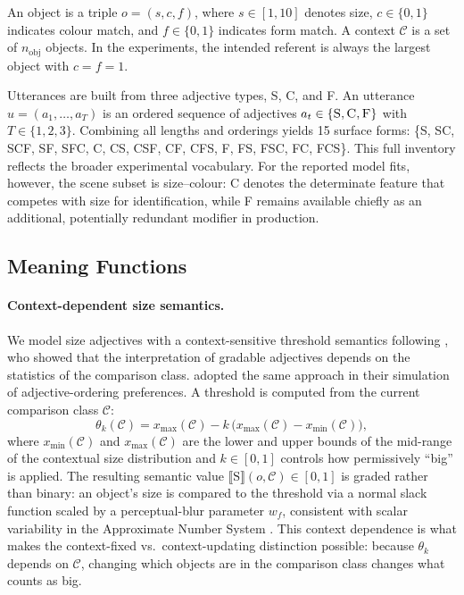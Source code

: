 \documentclass[man,floatsintext]{apa7}
\newcommand{\adj}[1]{\textsc{#1}}
\newcommand{\utter}[1]{\textsf{#1}}
\begin{document}
An object is a triple $o = (s, c, f)$, where $s \in [1,10]$ denotes size, $c \in \{0,1\}$ indicates colour match, and $f \in \{0,1\}$ indicates form match.
A context $\mathcal{C}$ is a set of $n_\text{obj}$ objects.
In the experiments, the intended referent is always the largest object with $c = f = 1$.

Utterances are built from three adjective types, \adj{S}, \adj{C}, and \adj{F}.
An utterance $u = (a_1, \ldots, a_T)$ is an ordered sequence of adjectives $a_t \in \{\adj{S}, \adj{C}, \adj{F}\}$ with $T \in \{1,2,3\}$.
Combining all lengths and orderings yields 15 surface forms:
\{\utter{S}, \utter{SC}, \utter{SCF}, \utter{SF}, \utter{SFC}, \utter{C}, \utter{CS}, \utter{CSF}, \utter{CF}, \utter{CFS}, \utter{F}, \utter{FS}, \utter{FSC}, \utter{FC}, \utter{FCS}\}.
This full inventory reflects the broader experimental vocabulary.
For the reported model fits, however, the scene subset is size--colour: \adj{C} denotes the determinate feature that competes with size for identification, while \adj{F} remains available chiefly as an additional, potentially redundant modifier in production.

\subsection{Meaning Functions}
\label{sec:model:semantics}

\paragraph{Context-dependent size semantics.}
We model size adjectives with a context-sensitive threshold semantics following \citet{schmidt2009how}, who showed that the interpretation of gradable adjectives depends on the statistics of the comparison class.
\citet{franke2019subjectivity} adopted the same approach in their simulation of adjective-ordering preferences.
A threshold is computed from the current comparison class $\mathcal{C}$:
\begin{equation}
  \theta_k(\mathcal{C})
  = x_\text{max}(\mathcal{C})
    - k \,\bigl(x_\text{max}(\mathcal{C}) - x_\text{min}(\mathcal{C})\bigr),
  \label{eq:threshold}
\end{equation}
where $x_\text{min}(\mathcal{C})$ and $x_\text{max}(\mathcal{C})$ are the lower and upper bounds of the mid-range of the contextual size distribution and $k \in [0,1]$ controls how permissively ``big'' is applied.
The resulting semantic value $\llbracket\text{S}\rrbracket(o, \mathcal{C}) \in [0,1]$ is graded rather than binary: an object's size is compared to the threshold via a normal slack function scaled by a perceptual-blur parameter $w_f$, consistent with scalar variability in the Approximate Number System \citep{feigenson2004core}.
This context dependence is what makes the context-fixed vs.\ context-updating distinction possible: because $\theta_k$ depends on $\mathcal{C}$, changing which objects are in the comparison class changes what counts as big.
\end{document}
